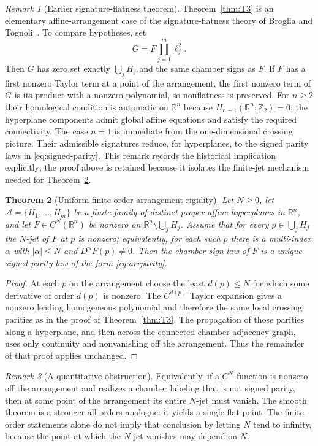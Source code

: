 \documentclass[11pt]{article}
\newtheorem{theorem}{Theorem}[section]
\theoremstyle{definition}
\theoremstyle{remark}
\newtheorem{remark}[theorem]{Remark}
\newcommand{\R}{\mathbb{R}}
\newcommand{\cA}{\mathcal{A}}
\begin{document}
\begin{remark}[Earlier signature-flatness theorem]\label{rem:BT}
Theorem~\ref{thm:T3} is an elementary affine-arrangement case of the signature-flatness theory of Broglia and Tognoli~\cite[Theorem~4.2]{BrogliaTognoli1989}. To compare hypotheses, set
\[
 G=F\prod_{j=1}^m\ell_j^2.
\]
Then $G$ has zero set exactly $\bigcup_jH_j$ and the same chamber signs as $F$. If $F$ has a first nonzero Taylor term at a point of the arrangement, the first nonzero term of $G$ is its product with a nonzero polynomial, so nonflatness is preserved. For $n\ge2$ their homological condition is automatic on $\R^n$ because $H_{n-1}(\R^n;\mathbb Z_2)=0$; the hyperplane components admit global affine equations and satisfy the required connectivity. The case $n=1$ is immediate from the one-dimensional crossing picture. Their admissible signatures reduce, for hyperplanes, to the signed parity laws in \eqref{eq:signed-parity}. This remark records the historical implication explicitly; the proof above is retained because it isolates the finite-jet mechanism needed for Theorem~\ref{thm:finitearr}.
\end{remark}

\begin{theorem}[Uniform finite-order arrangement rigidity]\label{thm:finitearr}
Let $N\ge0$, let $\cA=\{H_1,\dots,H_m\}$ be a finite family of distinct proper affine hyperplanes in $\R^n$, and let $F\in C^N(\R^n)$ be nonzero on $\R^n\setminus\bigcup_jH_j$. Assume that for every $p\in\bigcup_jH_j$ the $N$-jet of $F$ at $p$ is nonzero; equivalently, for each such $p$ there is a multi-index $\alpha$ with $|\alpha|\le N$ and $D^\alpha F(p)\ne0$. Then the chamber sign law of $F$ is a unique signed parity law of the form \eqref{eq:arrparity}.
\end{theorem}

\begin{proof}
At each $p$ on the arrangement choose the least $d(p)\le N$ for which some derivative of order $d(p)$ is nonzero. The $C^{d(p)}$ Taylor expansion gives a nonzero leading homogeneous polynomial and therefore the same local crossing parities as in the proof of Theorem~\ref{thm:T3}. The propagation of those parities along a hyperplane, and then across the connected chamber adjacency graph, uses only continuity and nonvanishing off the arrangement. Thus the remainder of that proof applies unchanged.
\end{proof}

\begin{remark}[A quantitative obstruction]
Equivalently, if a $C^N$ function is nonzero off the arrangement and realizes a chamber labeling that is not signed parity, then at some point of the arrangement its entire $N$-jet must vanish. The smooth theorem is a stronger all-orders analogue: it yields a single flat point. The finite-order statements alone do not imply that conclusion by letting $N$ tend to infinity, because the point at which the $N$-jet vanishes may depend on $N$.
\end{remark}
\end{document}
